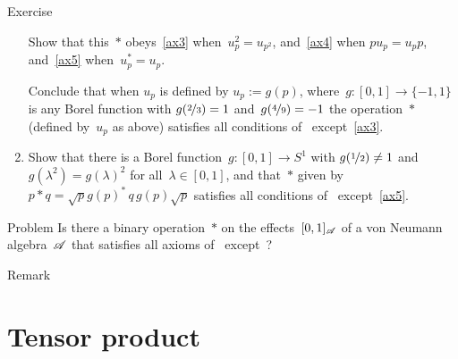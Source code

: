 \documentclass[a]{subfiles}
\begin{document}
\begin{parsec}
\begin{point}{Exercise}
\begin{enumerate}
Show that this~$\ast$ obeys~\ref{ax3} when~$u_p^2=u_{p^2}$,
and~\ref{ax4} when $pu_p=u_p p$,
and~\ref{ax5} when~$u_p^*=u_p$.

Conclude that when $u_p$ is defined by $u_p:=g(p)$,
where~$g\colon [0,1]\to\{-1,1\}$
is any Borel function with $g(\nicefrac{2}{3})=1$
and~$g(\nicefrac{4}{9})=-1$
the operation~$\ast$ (defined by~$u_p$ as above) satisfies
all conditions of~ except~\ref{ax3}.
\item
Show that there is a Borel
function~$g\colon[0,1]\to S^1$
with $g(\nicefrac{1}{2})\neq 1$
and~$g(\lambda^2)=g(\lambda)^2$ for all~$\lambda\in [0,1]$,
and that~$\ast$ given by~$p\ast q = \sqrt{p} g(p)^* \,q \,g(p)\sqrt{p}$
satisfies all conditions of~
except~\ref{ax5}.
\end{enumerate}
\end{point}
\begin{point}{Problem}%
Is there a binary operation~$\ast$
on the effects~$[0,1]_{\mathscr{A}}$
of a von Neumann algebra~$\mathscr{A}$
that satisfies all axioms of~
except~?
\end{point}
\begin{point}{Remark}%
\end{point}
\end{parsec}


\section{Tensor product}
\end{document}
